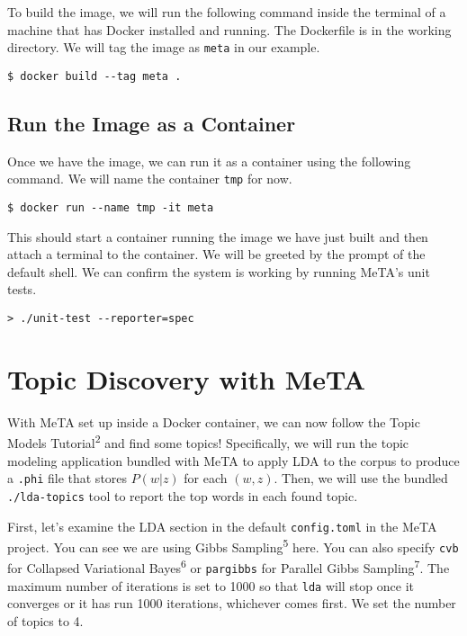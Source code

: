 \documentclass[11pt]{article}
\begin{document}
To build the image, we will run the following command inside the terminal of a machine that
has Docker installed and running.
The Dockerfile is in the working directory.
We will tag the image as \verb,meta, in our example.

\begin{verbatim}
$ docker build --tag meta .
\end{verbatim}

\subsection{Run the Image as a Container}

Once we have the image, we can run it as a container using the following command.
We will name the container \verb,tmp, for now.

\begin{verbatim}
$ docker run --name tmp -it meta
\end{verbatim}

This should start a container running the image we have just built and then attach a terminal to
the container. We will be greeted by the prompt of the default shell.
We can confirm the system is working by running MeTA's unit tests.

\begin{verbatim}
> ./unit-test --reporter=spec
\end{verbatim}

\section{Topic Discovery with MeTA}

With MeTA set up inside a Docker container, we can now follow the Topic Models
Tutorial\textsuperscript{2} and find some topics!
Specifically, we will run the topic modeling application bundled with MeTA to apply LDA to the
corpus to produce a \verb,.phi, file that stores $P(w|z)$ for each $(w,z)$.
Then, we will use the bundled \verb,./lda-topics, tool to report the top words in each found topic.

First, let's examine the LDA section in the default \verb,config.toml, in the MeTA project.
You can see we are using Gibbs Sampling\textsuperscript{5} here.
You can also specify \verb,cvb, for Collapsed Variational Bayes\textsuperscript{6}
or \verb,pargibbs, for Parallel Gibbs Sampling\textsuperscript{7}.
The maximum number of iterations is set to 1000 so that \verb,lda, will stop once it converges
or it has run 1000 iterations, whichever comes first.
We set the number of topics to 4.
\end{document}
